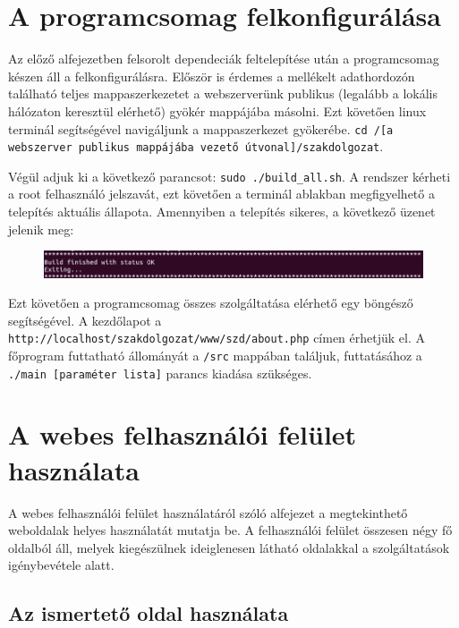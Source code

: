 \documentclass[oneside,titlepage,12pt,a4paper]{report}
\begin{document}
\section{A programcsomag felkonfigurálása}

Az előző alfejezetben felsorolt dependeciák feltelepítése után a programcsomag készen áll a felkonfigurálásra. Először is érdemes a mellékelt adathordozón található teljes mappaszerkezetet a webszerverünk publikus (legalább a lokális hálózaton keresztül elérhető) gyökér mappájába másolni. Ezt követően linux terminál segítségével navigáljunk a mappaszerkezet gyökerébe. \texttt{cd /[a webszerver publikus mappájába vezető útvonal]/szakdolgozat}. \par Végül adjuk ki a következő parancsot: \texttt{sudo ./build\_all.sh}. A rendszer kérheti a root felhasználó jelszavát, ezt követően a terminál ablakban megfigyelhető a telepítés aktuális állapota. Amennyiben a telepítés sikeres, a következő üzenet jelenik meg:

\begin{figure}[H]
\begin{center}
   \includegraphics[width=150mm]{./Abrak/WWW/buildDone.jpg}
\end{center}
\end{figure}

Ezt követően a programcsomag összes szolgáltatása elérhető egy böngésző segítségével. A kezdőlapot a \texttt{http://localhost/szakdolgozat/www/szd/about.php} címen érhetjük el. A főprogram futtatható állományát a \texttt{/src} mappában találjuk, futtatásához a \texttt{./main [paraméter lista]} parancs kiadása szükséges. 

\section{A webes felhasználói felület használata}

A webes felhasználói felület használatáról szóló alfejezet a megtekinthető weboldalak helyes használatát mutatja be. A felhasználói felület összesen négy fő oldalból áll, melyek kiegészülnek ideiglenesen látható oldalakkal a szolgáltatások igénybevétele alatt. 

\subsection*{Az ismertető oldal használata}
\end{document}
